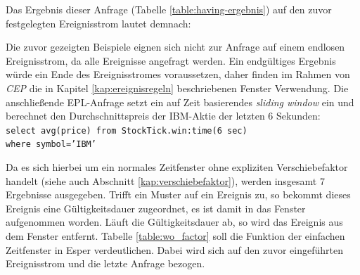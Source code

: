 \documentclass{acm_proc_article-sp}
\begin{document}
Das Ergebnis dieser Anfrage (Tabelle \ref{table:having-ergebnis}) auf den zuvor 
festgelegten Ereignisstrom lautet demnach:

\begin{table}[ht]
    \caption{Bedingung mit Aggregation}
    \label{table:having-ergebnis}\vspace{0.2cm}
\end{table}



Die zuvor gezeigten Beispiele eignen sich nicht zur Anfrage auf einem endlosen 
Ereignisstrom, da alle Ereignisse angefragt werden. Ein endgültiges Ergebnis würde ein 
Ende des Ereignisstromes voraussetzen, daher finden im Rahmen von \textit{CEP} die in 
Kapitel \ref{kap:ereignisregeln} beschriebenen Fenster Verwendung. Die anschließende 
EPL-Anfrage setzt ein auf Zeit basierendes \textit{sliding window} ein und berechnet den 
Durchschnittspreis der IBM-Aktie der letzten 6 Sekunden:\\

\texttt{select  avg(price) from StockTick.win:time(6 sec)\\where symbol='IBM'}

Da es sich hierbei um ein normales Zeitfenster ohne expliziten Verschiebefaktor handelt 
(siehe auch Abschnitt \ref{kap:verschiebefaktor}), werden insgesamt 7 Ergebnisse 
ausgegeben. Trifft ein Muster auf ein Ereignis zu, so bekommt dieses Ereignis eine 
Gültigkeitsdauer zugeordnet, es ist damit in das Fenster aufgenommen worden. Läuft die 
Gültigkeitsdauer ab, so wird das Ereignis aus dem Fenster entfernt. Tabelle 
\ref{table:wo_factor} soll die Funktion der einfachen Zeitfenster in Esper verdeutlichen. 
Dabei wird sich auf den zuvor eingeführten Ereignisstrom und die letzte Anfrage bezogen.
\end{document}

